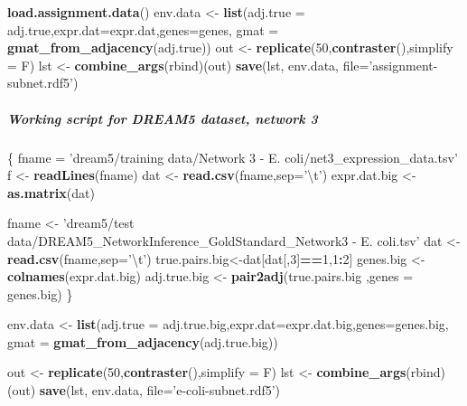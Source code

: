 \documentclass[]{article}
\newenvironment{Shaded}{\begin{snugshade}}{\end{snugshade}}
\newcommand{\KeywordTok}[1]{\textcolor[rgb]{0.13,0.29,0.53}{\textbf{#1}}}
\newcommand{\DataTypeTok}[1]{\textcolor[rgb]{0.13,0.29,0.53}{#1}}
\newcommand{\DecValTok}[1]{\textcolor[rgb]{0.00,0.00,0.81}{#1}}
\newcommand{\CharTok}[1]{\textcolor[rgb]{0.31,0.60,0.02}{#1}}
\newcommand{\StringTok}[1]{\textcolor[rgb]{0.31,0.60,0.02}{#1}}
\newcommand{\OperatorTok}[1]{\textcolor[rgb]{0.81,0.36,0.00}{\textbf{#1}}}
\newcommand{\NormalTok}[1]{#1}
\let\oldsubparagraph\subparagraph
\renewcommand{\subparagraph}[1]{\oldsubparagraph{#1}\mbox{}}
\theoremstyle{definition}
\theoremstyle{definition}
\theoremstyle{definition}
\theoremstyle{remark}
\begin{document}
\begin{Shaded}
\begin{Highlighting}[]
\KeywordTok{load.assignment.data}\NormalTok{()}
\NormalTok{env.data <-}\StringTok{ }\KeywordTok{list}\NormalTok{(}\DataTypeTok{adj.true =}\NormalTok{ adj.true,}\DataTypeTok{expr.dat=}\NormalTok{expr.dat,}\DataTypeTok{genes=}\NormalTok{genes,}
                 \DataTypeTok{gmat =} \KeywordTok{gmat_from_adjacency}\NormalTok{(adj.true))}
\NormalTok{out <-}\StringTok{ }\KeywordTok{replicate}\NormalTok{(}\DecValTok{50}\NormalTok{,}\KeywordTok{contraster}\NormalTok{(),}\DataTypeTok{simplify =}\NormalTok{ F)}
\NormalTok{lst <-}\StringTok{ }\KeywordTok{combine_args}\NormalTok{(rbind)(out)}
\KeywordTok{save}\NormalTok{(lst, env.data, }\DataTypeTok{file=}\StringTok{'assignment-subnet.rdf5'}\NormalTok{)}
\end{Highlighting}
\end{Shaded}

\subparagraph{Working script for DREAM5 dataset, network
3}\label{working-script-for-dream5-dataset-network-3}

\begin{Shaded}
\begin{Highlighting}[]
\NormalTok{\{}
\NormalTok{  fname =}\StringTok{ 'dream5/training data/Network 3 - E. coli/net3_expression_data.tsv'}
\NormalTok{  f <-}\StringTok{ }\KeywordTok{readLines}\NormalTok{(fname)}
\NormalTok{  dat <-}\StringTok{ }\KeywordTok{read.csv}\NormalTok{(fname,}\DataTypeTok{sep=}\StringTok{'}\CharTok{\textbackslash{}t}\StringTok{'}\NormalTok{)}
\NormalTok{  expr.dat.big <-}\StringTok{ }\KeywordTok{as.matrix}\NormalTok{(dat)}
  
  
\NormalTok{  fname <-}\StringTok{ 'dream5/test data/DREAM5_NetworkInference_GoldStandard_Network3 - E. coli.tsv'}
\NormalTok{  dat <-}\StringTok{ }\KeywordTok{read.csv}\NormalTok{(fname,}\DataTypeTok{sep=}\StringTok{'}\CharTok{\textbackslash{}t}\StringTok{'}\NormalTok{)}
\NormalTok{  true.pairs.big<-dat[dat[,}\DecValTok{3}\NormalTok{]}\OperatorTok{==}\DecValTok{1}\NormalTok{,}\DecValTok{1}\OperatorTok{:}\DecValTok{2}\NormalTok{]}
\NormalTok{  genes.big <-}\StringTok{ }\KeywordTok{colnames}\NormalTok{(expr.dat.big)}
\NormalTok{  adj.true.big <-}\StringTok{ }\KeywordTok{pair2adj}\NormalTok{(true.pairs.big ,}\DataTypeTok{genes =}\NormalTok{ genes.big)}
\NormalTok{\}}

\NormalTok{env.data <-}\StringTok{ }\KeywordTok{list}\NormalTok{(}\DataTypeTok{adj.true =}\NormalTok{ adj.true.big,}\DataTypeTok{expr.dat=}\NormalTok{expr.dat.big,}\DataTypeTok{genes=}\NormalTok{genes.big,}
                 \DataTypeTok{gmat =} \KeywordTok{gmat_from_adjacency}\NormalTok{(adj.true.big))}

\NormalTok{out <-}\StringTok{ }\KeywordTok{replicate}\NormalTok{(}\DecValTok{50}\NormalTok{,}\KeywordTok{contraster}\NormalTok{(),}\DataTypeTok{simplify =}\NormalTok{ F)}
\NormalTok{lst <-}\StringTok{ }\KeywordTok{combine_args}\NormalTok{(rbind)(out)}
\KeywordTok{save}\NormalTok{(lst, env.data, }\DataTypeTok{file=}\StringTok{'e-coli-subnet.rdf5'}\NormalTok{)}
\end{Highlighting}
\end{Shaded}
\end{document}
